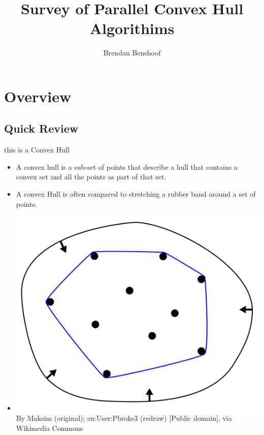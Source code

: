 \documentclass[11pt]{beamer}
\author{Brendan Benshoof}
\title{Survey of Parallel Convex Hull Algorithims}
\begin{document}
\setcounter{tocdepth}{3}
\begin{frame}
\titlepage
\end{frame}

\section{Overview}
\subsection{Quick Review}

\begin{frame}{this is a Convex Hull}
  \begin{itemize}
  \item
    A convex hull is a sub-set of points that describe a hull that contains a convex set and all the points as part of that set.
  \item
  	A convex Hull is often compared to stretching a rubber band around a set of points.
  \item
   \includegraphics[width=.5\linewidth]{imgs/convex_hull.png}
By Maksim (original); en:User:Pbroks3 (redraw) [Public domain], via Wikimedia Commons
  \end{itemize}
\end{frame}
\end{document}
